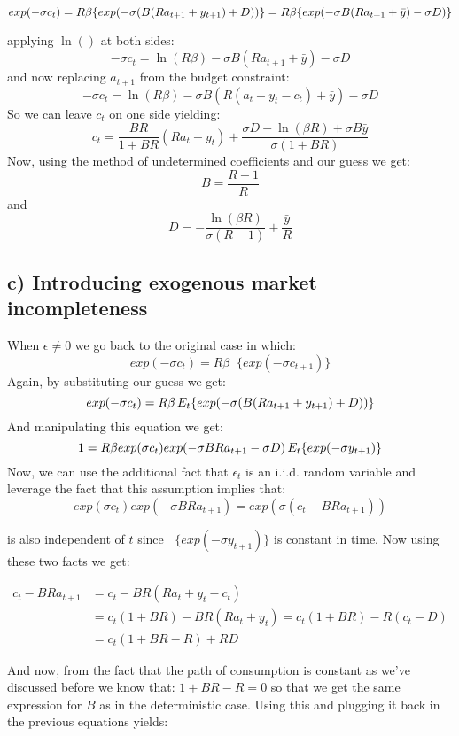 \documentclass[11pt]{article}
\begin{document}
\[
exp(-\sigma c_t)= R\beta \{exp(-\sigma (B(Ra_{t+1}+y_{t+1})+D))\}\\
                = R\beta \{exp(-\sigma B(Ra_{t+1}+\bar{y})-\sigma D)\}
\]

applying \(\ln()\) at both sides:
\[-\sigma c_t =\ln(R\beta) -\sigma B(Ra_{t+1}+\bar{y})-\sigma D\] and
now replacing \(a_{t+1}\) from the budget constraint:
\[-\sigma c_t =\ln(R\beta) -\sigma B(R(a_t+y_t-c_t)+\bar{y})-\sigma D\]
So we can leave \(c_t\) on one side yielding:
\[c_t =\frac{BR}{1+BR}(Ra_t+y_t)+\frac{\sigma D -\ln(\beta R)+\sigma B \bar{y}}{\sigma (1+BR)}\]
Now, using the method of undetermined coefficients and our guess we get:
\[B=\frac{R-1}{R}\] and
\[D=-\frac{\ln(\beta R)}{\sigma (R-1)}+\frac{\bar{y}}{R}\]

    \hypertarget{c-introducing-exogenous-market-incompleteness}{%
\subsection{c) Introducing exogenous market
incompleteness}\label{c-introducing-exogenous-market-incompleteness}}

When \(\epsilon\neq0\) we go back to the original case in which: \[
exp(-\sigma c_t)=R\beta \mathop{E_t}\{exp(-\sigma c_{t+1})\}
\] Again, by substituting our guess we get: \[
exp(-\sigma c_t)= R\beta \mathop{E_t}\{exp(-\sigma (B(Ra_{t+1}+y_{t+1})+D))\}\\
\] And manipulating this equation we get: \[
1= R\beta exp(\sigma c_t) exp(-\sigma BR a_{t+1}-\sigma D)\mathop{E_t}\{exp(-\sigma y_{t+1})\}\\
\] Now, we can use the additional fact that \(\epsilon_t\) is an i.i.d.
random variable and leverage the fact that this assumption implies that:
\[ exp(\sigma c_t) exp(-\sigma BR a_{t+1}) = exp(\sigma(c_t-BRa_{t+1}))\]

is also independent of \(t\) since
\(\mathop{E_t}\{exp(-\sigma y_{t+1})\}\) is constant in time. Now using
these two facts we get:

\begin{align*}
c_t-BR a_{t+1} &= c_t - BR(Ra_t+y_t-c_t)\\ &=c_t (1+BR)-BR(Ra_t+y_t)=c_t(1+BR)-R(c_t-D)\\ &=c_t(1+BR-R)+RD
\end{align*}

And now, from the fact that the path of consumption is constant as we've
discussed before we know that: \(1+BR-R=0\) so that we get the same
expression for \(B\) as in the deterministic case. Using this and
plugging it back in the previous equations yields:
\end{document}
